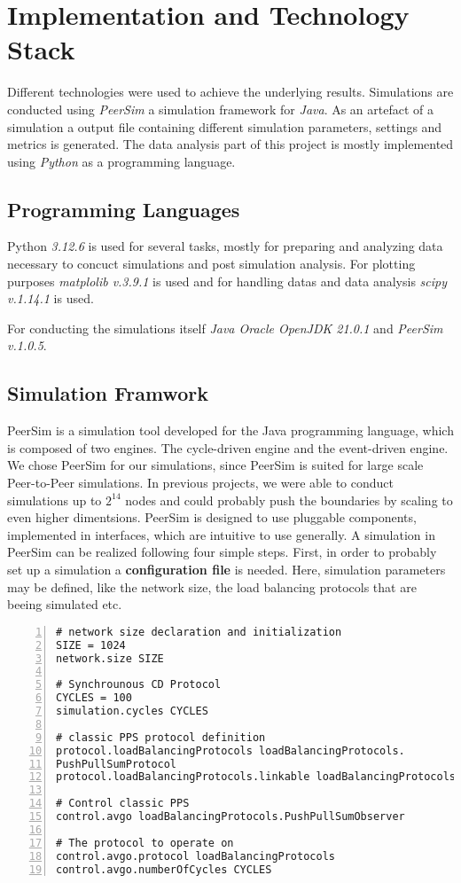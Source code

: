 \chapter{Implementation and Technology Stack}\label{chap:implementation}
Different technologies were used to achieve the underlying results. Simulations are conducted using \textit{PeerSim} a simulation framework for \textit{Java}. As an artefact of a simulation a output file containing different simulation parameters, settings and metrics is generated. The data analysis part of this project is mostly implemented using \textit{Python} as a programming language.

\section{Programming Languages}\label{sec:proglangs}
Python \textit{3.12.6} is used for several tasks, mostly for preparing and analyzing data necessary to concuct simulations and post simulation analysis. For plotting purposes \textit{matplolib v.3.9.1} is used and for handling datas and data analysis \textit{scipy v.1.14.1} is used.

For conducting the simulations itself \textit{Java Oracle OpenJDK 21.0.1} and \textit{PeerSim v.1.0.5}.

\section{Simulation Framwork}\label{sec:simulationframework}
PeerSim is a simulation tool developed for the Java programming language, which is composed of two engines. The cycle-driven engine and the event-driven engine. We chose PeerSim for our simulations, since PeerSim is suited for large scale Peer-to-Peer simulations. In previous projects, we were able to conduct simulations up to $2^{14}$ nodes and could probably push the boundaries by scaling to even higher dimentsions. PeerSim is designed to use pluggable components, implemented in interfaces, which are intuitive to use generally. A simulation in PeerSim can be realized following four simple steps. First, in order to probably set up a simulation a \textbf{configuration file} is needed. Here, simulation parameters may be defined, like the network size, the load balancing protocols that are beeing simulated etc.

\begin{lstlisting}[caption=Example Configuration, captionpos=b, numbers=left, label=lst:exampleConfig]
# network size declaration and initialization
SIZE = 1024
network.size SIZE

# Synchrounous CD Protocol
CYCLES = 100
simulation.cycles CYCLES

# classic PPS protocol definition
protocol.loadBalancingProtocols loadBalancingProtocols.
PushPullSumProtocol
protocol.loadBalancingProtocols.linkable loadBalancingProtocols

# Control classic PPS
control.avgo loadBalancingProtocols.PushPullSumObserver

# The protocol to operate on
control.avgo.protocol loadBalancingProtocols
control.avgo.numberOfCycles CYCLES
\end{lstlisting}

